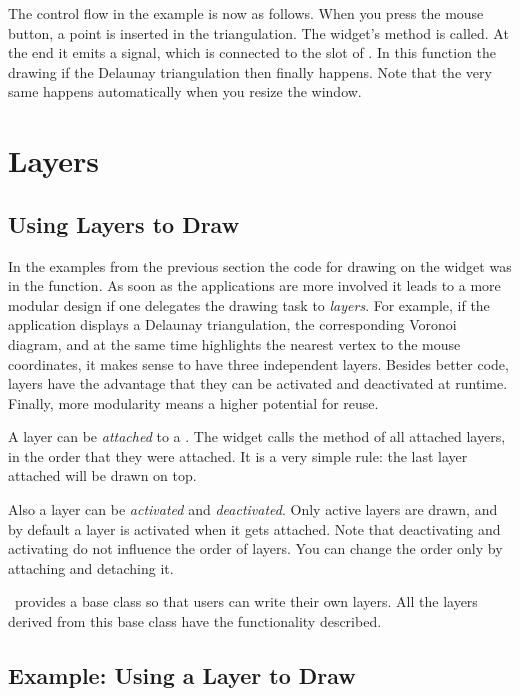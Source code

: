The control flow in the example is now as follows. When you press the
mouse button, a point is inserted in the triangulation.  The widget's
method  is called. At the end it emits a signal, which is
connected to the slot of . In this
function the drawing if the Delaunay triangulation then finally
happens.  Note that the very same happens automatically when you
resize the window.

\section{Layers}
\label{Qt_widget_layers}
\subsection{Using Layers to Draw}

In the examples from the previous section the code for drawing on the
widget was in the  function. As soon as the
applications are more involved it leads to a more modular design if
one delegates the drawing task to {\em layers}. For example, if the
application displays a Delaunay triangulation, the corresponding
Voronoi diagram, and at the same time highlights the nearest vertex to
the mouse coordinates, it makes sense to have three independent
layers. Besides better code, layers have the advantage that they can
be activated and deactivated at runtime. Finally, more modularity
means a higher potential for reuse.

A layer can be {\em attached} to a . The widget calls
the method  of all attached layers, in the
order that they were attached. It is a very simple rule: the last layer
attached will be drawn on top.

Also a layer can be {\em activated} and {\em deactivated}. Only active
layers are drawn, and by default a layer is activated when it gets
attached.  Note that deactivating and activating do not influence the
order of layers. You can change the order only by attaching and
detaching it.


\cgal\ provides a base class so that users can write their own
layers. All the layers derived from this base class
 have the functionality described.


\subsection{Example: Using a Layer to Draw}

